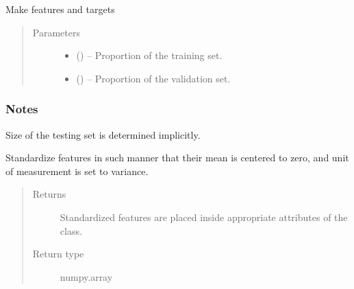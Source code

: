 \documentclass[letterpaper,10pt,english]{sphinxmanual}
\begin{document}
\begin{fulllineitems}
\begin{fulllineitems}
\label{\detokenize{api/ucf.TrainingDataSets:ucf.TrainingDataSets.make_training_data}}
Make features and targets
\begin{quote}\begin{description}
\item[{Parameters}] \leavevmode\begin{itemize}
\item {} 
 () -- Proportion of the training set.

\item {} 
 () -- Proportion of the validation set.

\end{itemize}

\end{description}\end{quote}
\subsubsection*{Notes}

Size of the testing set is determined implicitly.

\end{fulllineitems}


\begin{fulllineitems}
\label{\detokenize{api/ucf.TrainingDataSets:ucf.TrainingDataSets.scale_features}}
Standardize features in such manner that their mean is centered
to zero, and unit of measurement is set to variance.
\begin{quote}\begin{description}
\item[{Returns}] \leavevmode
Standardized features are placed inside appropriate
attributes of the class.

\item[{Return type}] \leavevmode
numpy.array

\end{description}\end{quote}


\end{fulllineitems}
\end{fulllineitems}
\end{document}
